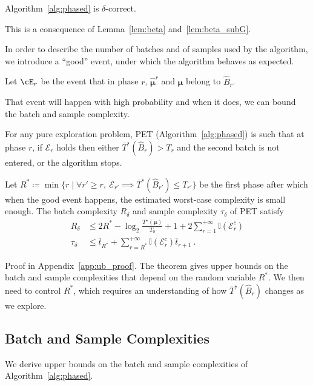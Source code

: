 \begin{theorem}
	Algorithm~\ref{alg:phased} is $\delta$-correct.
\end{theorem}
This is a consequence of Lemma~\ref{lem:beta} and~\ref{lem:beta_subG}.

In order to describe the number of batches and of samples used by the algorithm, we introduce a ``good'' event, under which the algorithm behaves as expected.
\begin{definition}
	Let $\cE_r$ be the event that in phase $r$, $\bm{\hat{\mu}}^r$ and $\bm\mu$ belong to $\hat{B}_r$.
\end{definition}


That event will happen with high probability and when it does, we can bound the batch and sample complexity.

\begin{lemma}\label{th:alggen} For any pure exploration problem, PET (Algorithm~\ref{alg:phased}) is such that at phase $r$, if $\mathcal E_r$ holds then
either $\overline{T}^\star(\hat{B}_r) > T_r$ and the second batch is not entered, or the algorithm stops.

Let $R^* \coloneqq \min \{r \mid \forall r' \ge r, \ \mathcal E_{r'} \implies \overline{T}^\star(\hat{B}_{r'}) \le T_{r'}\}$ be the first phase after which when the good event happens, the estimated worst-case complexity is small enough.
The batch complexity $R_\delta$ and sample complexity $\tau_\delta$ of PET satisfy
\begin{align*}
R_\delta
&\le 2R^*- \log_2 \frac{T^\star(\bm\mu)}{T_0} + 1 + 2 \sum_{r=1}^{+\infty} \mathbb{I}(\mathcal E_{r}^c)
\\
\tau_\delta
&\le \bar{t}_{R^*} + \sum_{r=R^*}^{+\infty} \mathbb{I}(\mathcal E_r^c) \bar{t}_{r+1}
\: .
\end{align*}
\end{lemma}

Proof in Appendix~\ref{app:ub_proof}. The theorem gives upper bounds on the batch and sample complexities that depend on the random variable $R^*$.
We then need to control $R^*$, which requires an understanding of how $\overline{T}^\star(\hat{B}_{r})$ changes as we explore.


\subsection{Batch and Sample Complexities}

We derive upper bounds on the batch and sample complexities of Algorithm~\ref{alg:phased}.

